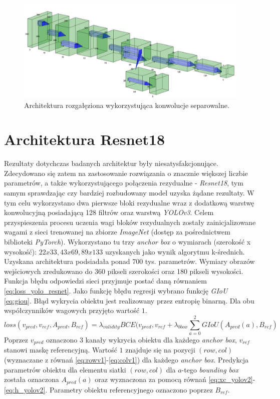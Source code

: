 \begin{figure}
    \centering
    \includegraphics[width=\linewidth]{images/Architektura_branched.png}
    \caption{Architektura rozgałęziona wykorzystująca konwolucje separowalne.}
    \label{fig:arch_v2}
\end{figure}


\section{Architektura Resnet18}

Rezultaty dotychczas badanych architektur były niesatysfakcjonujące.
Zdecydowano się zatem na zastosowanie rozwiązania o znacznie większej liczbie parametrów,  a także wykorzystującego połączenia rezydualne - \emph{Resnet18}\cite{resnet18}, tym samym sprawdzając czy bardziej rozbudowany model uzyska żądane rezultaty. 
W tym celu wykorzystano dwa pierwsze bloki rezydualne wraz z dodatkową warstwę konwolucyjną posiadającą 128 filtrów oraz warstwą \emph{YOLOv3}. 
Celem przyspieszenia procesu uczenia wagi bloków rezydualnych zostały zainicjalizowane wagami z sieci trenowanej na zbiorze \emph{ImageNet}\cite{imagenet} (dostęp za pośrednictwem biblioteki \emph{PyTorch}).
Wykorzystano tu trzy \emph{anchor box} o wymiarach (szerokość x wysokość): $22x33, 43x69, 89x133$ uzyskanych jako wynik algorytmu k-średnich. 
Uzyskana architektura podsiadała ponad 700 tys. parametrów.
Wymiary obrazów wejściowych zredukowano do 360 pikseli szerokości oraz 180 pikseli wysokości.
Funkcja błędu odpowiedzi sieci przyjmuje postać daną równaniem \eqref{eq:loss_yolo_resnet}.
Jako funkcję błędu regresji wybrano funkcję \emph{GIoU} \eqref{eq:giou}.
Błąd wykrycia obiektu jest realizowany przez entropię binarną.
Dla obu współczynników wagowych przyjęto wartość $1$.
\begin{equation}
loss(v_{pred},v_{ref},A_{pred}, B_{ref}) = \lambda_{validity} BCE(v_{pred}, v_{ref} + \lambda_{bbox} \sum_{a = 0}^{2} GIoU(A_{pred}(a), B_{ref})
\label{eq:loss_yolo_resnet}
\end{equation}
Poprzez $v_{pred}$ oznaczono 3 kanały wykrycia obiektu dla każdego \emph{anchor box}, 
$v_{ref}$ stanowi maskę referencyjną.
Wartość $1$ znajduje się na pozycji $(row,col)$ (wyznaczane z równań \eqref{eq:rowv1}-\eqref{eq:colv1}) dla każdego \emph{anchor box}.
Predykcja parametrów obiektu dla elementu siatki $(row,col)$ dla $a$-tego \emph{bounding box} została oznaczona $A_{pred}(a)$ oraz wyznaczona za pomocą równań \eqref{eq:xc_yolov2}-\eqref{eq:h_yolov2}.
Parametry obiektu referencyjnego oznaczono poprzez $B_{ref}$. 


